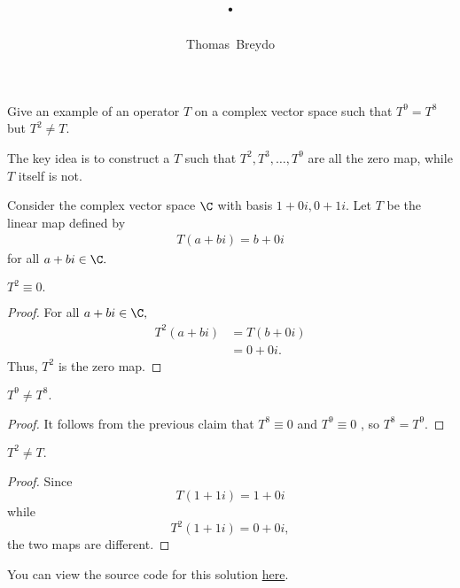 \documentclass{amsart}
\title{\pagenum.\probnum}
\author{Thomas\ Breydo}
\newcommand{\pagenum}{223}
\newcommand{\probnum}{8}
\begin{document}
\maketitle

\begin{problem*}
Give an example of an operator $T$ on a complex
vector space such that $T^9=T^8$ but $T^2\ne T.$
\end{problem*}

\vspace{0.5in}

The key idea is to construct a $T$ such that $T^2,T^3,\dots,T^9$
are all the zero map, while $T$ itself is not.

Consider the complex vector space $\C$ with basis $1+0i,0+1i.$
Let $T$ be the linear map defined by
\begin{align*}
    T(a+bi)=b+0i
\end{align*}
for all $a+bi\in\C.$

\begin{claim*}
$T^2\equiv 0.$
\end{claim*}
\begin{proof}
For all $a+bi\in\C,$
\begin{align*}
    T^2(a+bi) &= T(b+0i)\\
              &= 0+0i.
\end{align*}
Thus, $T^2$ is the zero map. \end{proof}

\begin{claim*}
$T^9\ne T^8.$
\end{claim*}
\begin{proof}
It follows from the previous claim that $T^8\equiv 0$ and $T^9\equiv 0$
, so $T^8=T^9.$
\end{proof}

\begin{claim*}
$T^2\ne T.$
\end{claim*}
\begin{proof}
Since $$T(1+1i)=1+0i$$ while $$T^2(1+1i)=0+0i,$$ the two maps
are different.
\end{proof}
\vspace{0.5in}

\begin{note*}
You can view the source code for this solution
\href{https://github.com/thomasbreydo/linalg/blob/main/\pagenum_\probnum_Thomas_Breydo.tex}
{here}.
\end{note*}
\end{document}
